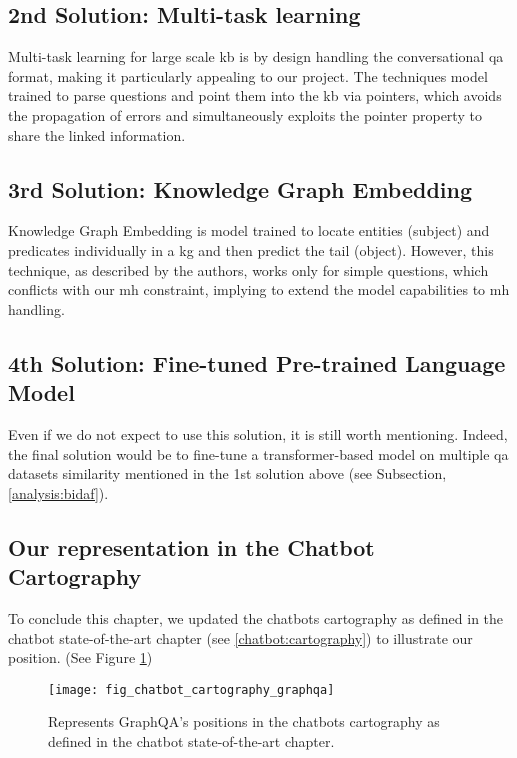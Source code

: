 \subsection{2nd Solution: Multi-task learning}
Multi-task learning for large scale \gls{kb} \autocite{paper:2019arXiv191005069S} is by design handling the conversational \gls{qa} format, making it particularly appealing to our project. The techniques model trained to parse questions and point them into the \gls{kb} via pointers, which avoids the propagation of errors and simultaneously exploits the pointer property to share the linked information.

\subsection{3rd Solution: Knowledge Graph Embedding}
Knowledge Graph Embedding \autocite{paper:2019arXiv191102168W} is model trained to locate entities (subject) and predicates individually in a \gls{kg} and then predict the tail (object). However, this technique, as described by the authors, works only for simple questions, which conflicts with our \gls{mh} constraint, implying to extend the model capabilities to \gls{mh} handling. 

\subsection{4th Solution: Fine-tuned Pre-trained Language Model}
Even if we do not expect to use this solution, it is still worth mentioning. Indeed, the final solution would be to fine-tune a transformer-based model on multiple \gls{qa} datasets similarity mentioned in the 1st solution above (see Subsection, \ref{analysis:bidaf}).


\subsection{Our representation in the Chatbot Cartography}
To conclude this chapter, we updated the chatbots cartography as defined in the chatbot state-of-the-art chapter (see \ref{chatbot:cartography}) to illustrate our position. (See Figure \ref{fig:fig_chatbot_cartography_graphqa})

\begin{figure}[H]
    \centering
    \texttt{[image: fig\_chatbot\_cartography\_graphqa]}
    \caption{Represents GraphQA's positions in the chatbots cartography as defined in the chatbot state-of-the-art chapter.}
    \label{fig:fig_chatbot_cartography_graphqa}
\end{figure}


